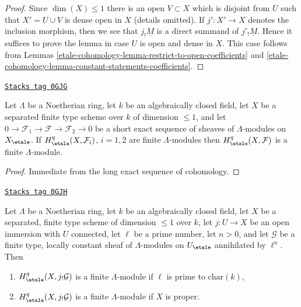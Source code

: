 \begin{proof}
Since $\dim(X) \leq 1$ there is an open $V \subset X$ which is disjoint from
$U$ such that $X' = U \cup V$ is dense open in $X$ (details omitted).
If $j' : X' \to X$ denotes the inclusion morphism, then we see that
$j_!\underline{M}$ is a direct summand of $j'_!\underline{M}$.
Hence it suffices to prove the lemma in case $U$ is open and dense in $X$.
This case follows from Lemmas \ref{etale-cohomology-lemma-restrict-to-open-coefficients}
and \ref{etale-cohomology-lemma-constant-statements-coefficients}.
\end{proof}

\begin{lemma}
\label{etale-cohomology-lemma-ses-statements-coefficients}
\href{https://stacks.math.columbia.edu/tag/0GJG}{\texttt{Stacks tag 0GJG}}

Let $\Lambda$ be a Noetherian ring, let $k$ be an algebraically closed field,
let $X$ be a separated finite type scheme over $k$ of dimension $\leq 1$, and
let $0 \to \mathcal{F}_1 \to \mathcal{F} \to \mathcal{F}_2 \to 0$
be a short exact sequence of sheaves of $\Lambda$-modules on $X_\etale$. If
$H^q_\etale(X, \mathcal{F}_i)$, $i = 1, 2$ are finite $\Lambda$-modules
then $H^q_\etale(X, \mathcal{F})$ is a finite $\Lambda$-module.
\end{lemma}

\begin{proof}
Immediate from the long exact sequence of cohomology.
\end{proof}

\begin{lemma}
\label{etale-cohomology-lemma-vanishing-easier-coefficients}
\href{https://stacks.math.columbia.edu/tag/0GJH}{\texttt{Stacks tag 0GJH}}

Let $\Lambda$ be a Noetherian ring, let $k$ be an algebraically closed field,
let $X$ be a separated, finite type scheme of dimension $\leq 1$ over $k$,
let $j : U \to X$ be an open immersion with $U$ connected, let
$\ell$ be a prime number, let $n > 0$, and let $\mathcal{G}$ be a finite type,
locally constant sheaf of $\Lambda$-modules on $U_\etale$ annihilated by
$\ell^n$. Then
\begin{enumerate}
\item $H^q_\etale(X, j_!\mathcal{G})$ is a finite $\Lambda$-module
if $\ell$ is prime to $\text{char}(k)$,
\item $H^q_\etale(X, j_!\mathcal{G})$ is a finite $\Lambda$-module
if $X$ is proper.
\end{enumerate}
\end{lemma}

